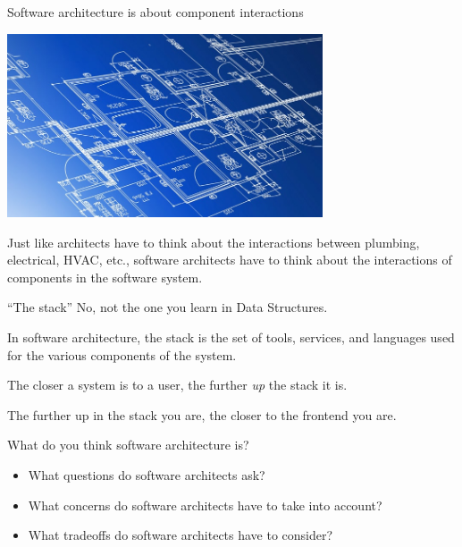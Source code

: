 \documentclass{beeper}
\begin{document}
\begin{frame}{Software architecture is about component interactions}
    \centerline{\includegraphics[width=0.7\textwidth]{images/architectural-blueprint}}

    Just like architects have to think about the interactions between plumbing,
    electrical, HVAC, etc., software architects have to think about the
    interactions of components in the software system.
\end{frame}

\begin{frame}{``The stack''}
    No, not the one you learn in Data Structures.
    \pause

    In software architecture, the stack is the set of tools, services, and
    languages used for the various components of the system.
    \pause

    The closer a system is to a user, the further \textit{up} the stack it is.

    The further up in the stack you are, the closer to the frontend you are.
\end{frame}

\begin{frame}{What do you think software architecture is?}
    \begin{itemize}[<+->]
        \item What questions do software architects ask?
        \item What concerns do software architects have to take into account?
        \item What tradeoffs do software architects have to consider?
    \end{itemize}
\end{frame}
\end{document}
